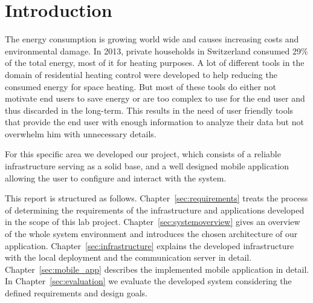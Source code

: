 
\chapter{Introduction}
\label{sec:introduction}



The energy consumption is growing world wide and causes increasing costs and environmental damage.
In 2013, private households in Switzerland consumed 29\% of the total energy\cite{schweizerischeGesamtenergiestatistik2013}, most of it for heating purposes\cite{analyseEnergieverbrauchVerwendungszwecke2013}.
A lot of different tools in the domain of residential heating control were developed to help reducing the consumed energy for space heating.
But most of these tools do either not motivate end users to save energy or are too complex to use for the end user and thus discarded in the long-term.
This results in the need of user friendly tools that provide the end user with enough information to analyze their data but not overwhelm him with unnecessary details.


For this specific area we developed our project, which consists of a reliable infrastructure serving as a solid base, and a well designed mobile application allowing the user to configure and interact with the system.

This report is structured as follows.
Chapter~\ref{sec:requirements} treats the process of determining the requirements of the infrastructure and applications developed in the scope of this lab project.
Chapter~\ref{sec:systemoverview} gives an overview of the whole system environment and introduces the chosen architecture of our application.
Chapter~\ref{sec:infrastructure} explains the developed infrastructure with the local deployment and the communication server in detail.
Chapter~\ref{sec:mobile_app} describes the implemented mobile application in detail.
In Chapter~\ref{sec:evaluation} we evaluate the developed system considering the defined requirements and design goals.



